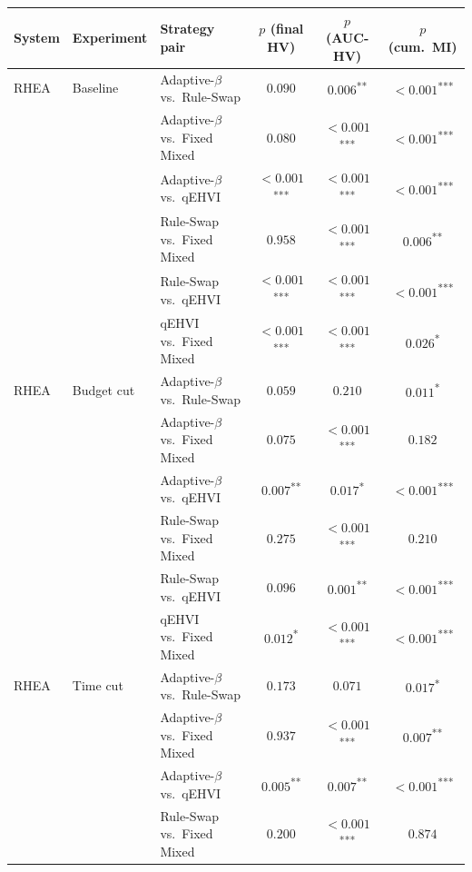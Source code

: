 \begin{tabular}{lllccc}
\toprule
System & Experiment & Strategy pair & $p$ (final HV) & $p$ (AUC-HV) & $p$ (cum.\ MI) \\
\midrule
RHEA & Baseline & Adaptive-$\beta$ vs.\ Rule-Swap & $0.090$ & $0.006$\textsuperscript{**} & $<0.001$\textsuperscript{***} \\
 &  & Adaptive-$\beta$ vs.\ Fixed Mixed & $0.080$ & $<0.001$\textsuperscript{***} & $<0.001$\textsuperscript{***} \\
 &  & Adaptive-$\beta$ vs.\ qEHVI & $<0.001$\textsuperscript{***} & $<0.001$\textsuperscript{***} & $<0.001$\textsuperscript{***} \\
 &  & Rule-Swap vs.\ Fixed Mixed & $0.958$ & $<0.001$\textsuperscript{***} & $0.006$\textsuperscript{**} \\
 &  & Rule-Swap vs.\ qEHVI & $<0.001$\textsuperscript{***} & $<0.001$\textsuperscript{***} & $<0.001$\textsuperscript{***} \\
 &  & qEHVI vs.\ Fixed Mixed & $<0.001$\textsuperscript{***} & $<0.001$\textsuperscript{***} & $0.026$\textsuperscript{*} \\
\midrule
RHEA & Budget cut & Adaptive-$\beta$ vs.\ Rule-Swap & $0.059$ & $0.210$ & $0.011$\textsuperscript{*} \\
 &  & Adaptive-$\beta$ vs.\ Fixed Mixed & $0.075$ & $<0.001$\textsuperscript{***} & $0.182$ \\
 &  & Adaptive-$\beta$ vs.\ qEHVI & $0.007$\textsuperscript{**} & $0.017$\textsuperscript{*} & $<0.001$\textsuperscript{***} \\
 &  & Rule-Swap vs.\ Fixed Mixed & $0.275$ & $<0.001$\textsuperscript{***} & $0.210$ \\
 &  & Rule-Swap vs.\ qEHVI & $0.096$ & $0.001$\textsuperscript{**} & $<0.001$\textsuperscript{***} \\
 &  & qEHVI vs.\ Fixed Mixed & $0.012$\textsuperscript{*} & $<0.001$\textsuperscript{***} & $<0.001$\textsuperscript{***} \\
\midrule
RHEA & Time cut & Adaptive-$\beta$ vs.\ Rule-Swap & $0.173$ & $0.071$ & $0.017$\textsuperscript{*} \\
 &  & Adaptive-$\beta$ vs.\ Fixed Mixed & $0.937$ & $<0.001$\textsuperscript{***} & $0.007$\textsuperscript{**} \\
 &  & Adaptive-$\beta$ vs.\ qEHVI & $0.005$\textsuperscript{**} & $0.007$\textsuperscript{**} & $<0.001$\textsuperscript{***} \\
 &  & Rule-Swap vs.\ Fixed Mixed & $0.200$ & $<0.001$\textsuperscript{***} & $0.874$ \\

\end{tabular}
